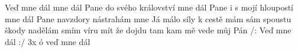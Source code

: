 \begin{TEXT}{Veď mne dál}
\SLOKA[A.]  mne dál Pane do svého království \NL
{} mne dál Pane i s mojí hloupostí \NL
{} mne dál Pane navzdory nástrahám \NL
{} mne  
\SLOKA[B.]Já málo síly k cestě mám \NL
sám spoustu škody nadělám \NL
smím víru mít že dojdu tam \NL
kam mě vede můj Pán 
\SLOKA[C.] /: Veď mne dál :/ 3x \NL
ó veď mne dál \NL
\end{TEXT}
